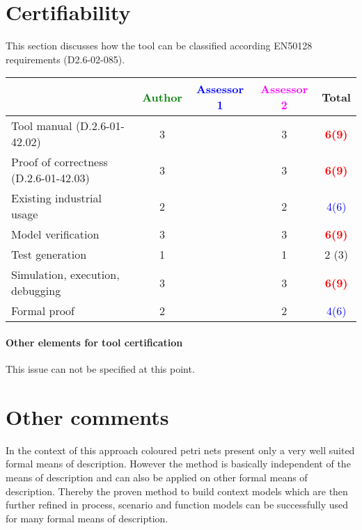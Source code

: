 \section{Certifiability}

This section discusses how the tool can be classified according EN50128 requirements (D2.6-02-085).


\begin{tabular}{|l | c | c | c | c|}
\hline
& \textcolor{green}{Author} & \textcolor{blue}{Assessor 1} & \textcolor{magenta}{Assessor 2} & Total \\
\hline 
Tool manual (D.2.6-01-42.02) & 3     & & 3     & \textcolor{red}{\textbf{6(9)}}   \\
\hline
Proof of correctness (D.2.6-01-42.03)   & 3      & & 3     & \textcolor{red}{\textbf{6(9)}}  \\
\hline
Existing industrial  usage  & 2     & & 2     & \textcolor{blue}{4(6)}  \\
\hline
Model verification & 3     & & 3     & \textcolor{red}{\textbf{6(9)}}  \\
\hline
Test generation & 1     & & 1     & 2 (3) \\
\hline
Simulation, execution, debugging & 3     & & 3     & \textcolor{red}{\textbf{6(9)}}  \\
\hline
Formal proof & 2     & & 2     & \textcolor{blue}{4(6)}  \\
\hline
\end{tabular}


\paragraph{Other elements for tool certification}
This issue can not be specified at this point.


\section{Other comments}
In the context of this approach coloured petri nets present only a very well suited formal means of description. However the method is basically independent of the means of description and can also be applied on other formal means of description. Thereby the proven method to build context models which are then further refined in process, scenario and function models can be successfully used for many formal means of description. 



